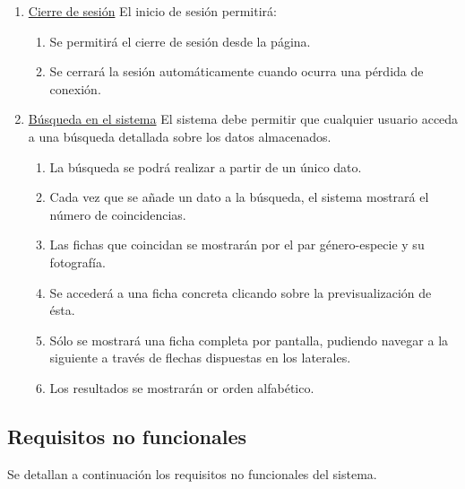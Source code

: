\documentclass[10pt,a4paper]{article}
\begin{document}
\begin{enumerate}[label=RF\arabic*. ,leftmargin=2.8\parindent]
	\bigskip
	\item \underline{Cierre de sesión}
	\newline \newline
	El inicio de sesión permitirá:
	\begin{enumerate}[label=-]
		\item Se permitirá el cierre de sesión desde la página.
		\item Se cerrará la sesión automáticamente cuando ocurra una pérdida de conexión.
	\end{enumerate}

	\bigskip
	\item \underline{Búsqueda en el sistema}
	\newline \newline
	El sistema debe permitir que cualquier usuario acceda a una búsqueda detallada sobre los datos almacenados.
	\begin{enumerate}[label=-]
		\item La búsqueda se podrá realizar a partir de un único dato.
		\item Cada vez que se añade un dato a la búsqueda, el sistema mostrará el número de coincidencias.
		\item Las fichas que coincidan se mostrarán por el par género-especie y su fotografía.
		\item Se accederá a una ficha concreta clicando sobre la previsualización de ésta.
		\item Sólo se mostrará una ficha completa por pantalla, pudiendo navegar a la siguiente a través de flechas dispuestas en los laterales.
		\item Los resultados se mostrarán or orden alfabético.

	\end{enumerate}
\end{enumerate}

\subsection{\textbf{Requisitos no funcionales}}

Se detallan a continuación los requisitos no funcionales del sistema.
\newline
\end{document}
